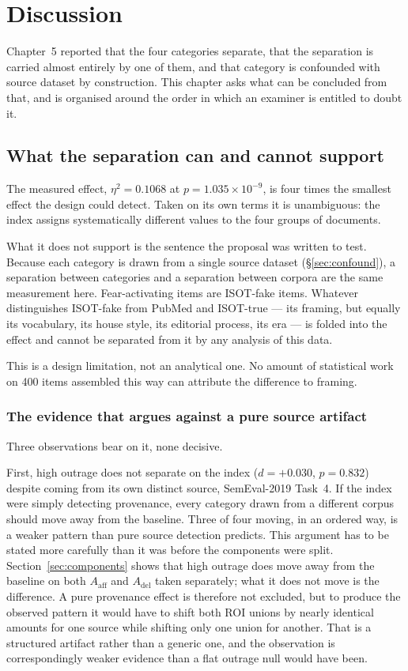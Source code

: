 \chapter{Discussion}
\label{ch:discussion}

Chapter~5 reported that the four categories separate, that the separation is carried almost
entirely by one of them, and that category is confounded with source dataset by construction.
This chapter asks what can be concluded from that, and is organised around the order in which
an examiner is entitled to doubt it.

\section{What the separation can and cannot support}

The measured effect, $\eta^2 = 0.1068$ at $p = 1.035\times10^{-9}$, is four times the
smallest effect the design could detect. Taken on its own terms it is unambiguous: the index
assigns systematically different values to the four groups of documents.

What it does not support is the sentence the proposal was written to test. Because each
category is drawn from a single source dataset (\S\ref{sec:confound}), a separation between
categories and a separation between corpora are the same measurement here. Fear-activating
items are ISOT-fake items. Whatever distinguishes ISOT-fake from PubMed and ISOT-true --- its
framing, but equally its vocabulary, its house style, its editorial process, its era --- is
folded into the effect and cannot be separated from it by any analysis of this data.

This is a design limitation, not an analytical one. No amount of statistical work on 400
items assembled this way can attribute the difference to framing.

\subsection{The evidence that argues against a pure source artifact}

Three observations bear on it, none decisive.

First, high outrage does not separate on the index ($d = +0.030$, $p = 0.832$) despite coming
from its own distinct source, SemEval-2019 Task~4. If the index were simply detecting
provenance, every category drawn from a different corpus should move away from the baseline.
Three of four moving, in an ordered way, is a weaker pattern than pure source detection
predicts. This argument has to be stated more carefully than it was before the components were
split. Section~\ref{sec:components} shows that high outrage does move away from the baseline on
both $A_{\mathrm{aff}}$ and $A_{\mathrm{del}}$ taken separately; what it does not move is the
difference. A pure provenance effect is therefore not excluded, but to produce the observed
pattern it would have to shift both ROI unions by nearly identical amounts for one source while
shifting only one union for another. That is a structured artifact rather than a generic one,
and the observation is correspondingly weaker evidence than a flat outrage null would have
been.

